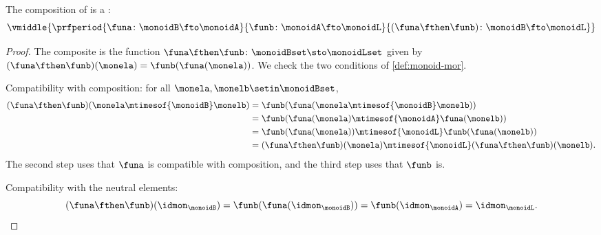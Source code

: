 \begin{lemma}
    \label{lem:monoid-morphisms-compose}
    The composition of  is a :
    \begin{equation}
        \label{eq:mon-mor-compo}
        \vmiddle{
            \prfperiod{
                \funa \colon \monoidB \fto \monoidA
            }{
                \funb \colon \monoidA \fto \monoidL
            }{
                (\funa \fthen \funb) \colon \monoidB \fto \monoidL
            }
        }
    \end{equation}
\end{lemma}
\begin{proof}
    The composite is the function $\funa \fthen \funb \colon \monoidBset \sto \monoidLset$ given by $(\funa \fthen \funb)(\monela) = \funb(\funa(\monela))$.
    We check the two conditions of \cref{def:monoid-mor}.

    Compatibility with composition: for all $\monela, \monelb \setin \monoidBset$,
    \begin{equation}
        \begin{aligned}
            (\funa \fthen \funb)(\monela \mtimesof{\monoidB} \monelb)
             & = \funb(\funa(\monela \mtimesof{\monoidB} \monelb))                                    \\
             & = \funb(\funa(\monela) \mtimesof{\monoidA} \funa(\monelb))                             \\
             & = \funb(\funa(\monela)) \mtimesof{\monoidL} \funb(\funa(\monelb))                      \\
             & = (\funa \fthen \funb)(\monela) \mtimesof{\monoidL} (\funa \fthen \funb)(\monelb).
        \end{aligned}
    \end{equation}
    The second step uses that $\funa$ is compatible with composition, and the third step uses that $\funb$ is.

    Compatibility with the neutral elements:
    \begin{equation}
        (\funa \fthen \funb)(\idmon_{\monoidB})
        = \funb(\funa(\idmon_{\monoidB}))
        = \funb(\idmon_{\monoidA})
        = \idmon_{\monoidL}.
    \end{equation}
\end{proof}

